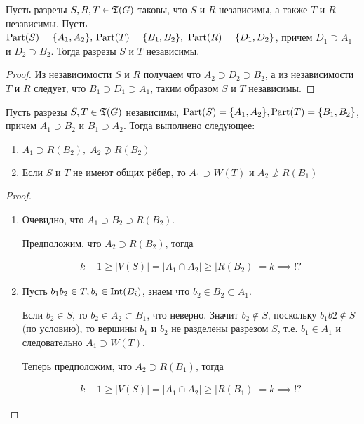 \begin{customlm}{7} \label{lemma:0_7}
	Пусть разрезы $S, R, T \in \mathfrak{T}(G)$ таковы, что  $S$ и  $R$ независимы, а также $T$ и  $R$ независимы.
	Пусть  $\operatorname{Part}(S) = \{A_1, A_2\}, \, \operatorname{Part}(T) = \{B_1, B_2\}, \ \operatorname{Part}(R) = \{D_1, D_2\}$, причем $D_1 \supset A_1$ и $D_2 \supset B_2$.
	Тогда разрезы $S$ и  $T$ независимы.
\end{customlm}

\begin{proof}
	Из независимости $S$ и  $R$ получаем что  $A_2 \supset D_2 \supset B_2$, а из независимости $T$ и  $R$ следует, что  $B_1 \supset D_1 \supset A_1$, таким образом $S$ и  $T$ независимы.
\end{proof}

\begin{customlm}{8}
	Пусть разрезы $S, T \in \mathfrak{T}(G)$ независимы,  $\operatorname{Part}(S) = \{A_1, A_2\}, \operatorname{Part}(T) = \{B_1, B_2\}$, причем $A_1 \supset B_2$ и $B_1 \supset A_2$. Тогда выполнено следующее:

	\begin{enumerate}
		\item $A_1 \supset R(B_2), \; A_2 \not \supset R(B_2)$
		\item Если $S$ и  $T$ не имеют общих рёбер, то  $A_1 \supset W(T)$ и $A_2 \not \supset R(B_1)$
	\end{enumerate}

\end{customlm}

\begin{proof}
	\begin{enumerate}
		\item Очевидно, что $A_1 \supset B_2 \supset R(B_2)$.

		Предположим, что $A_2 \supset R(B_2)$, тогда 

		\begin{align*}
			k - 1 \geqslant |V(S)| = |A_1 \cap A_2| \geqslant |R(B_2)| = k \implies \text{!?}
		\end{align*}

		\item Пусть $b_1b_2 \in T, b_i \in \operatorname{Int}(B_i)$, знаем что $b_2 \in B_2 \subset A_1$.

			Если $b_2 \in S$, то $b_2 \in A_2 \subset B_1$, что неверно.
			Значит $b_2 \not \in S$, поскольку $b_1b2 \not \in S$(по условию), то вершины $b_1$ и $b_2$ не разделены разрезом $S$, т.е. $b_1 \in A_1$ и следовательно $A_1 \supset W(T)$.

			Теперь предположим, что $A_2 \supset R(B_1)$, тогда 

			\begin{align*}
				k - 1 \geqslant |V(S)| = |A_1 \cap A_2| \geqslant |R(B_1)| = k \implies \text{!?}
			\end{align*}

	\end{enumerate}
\end{proof}
